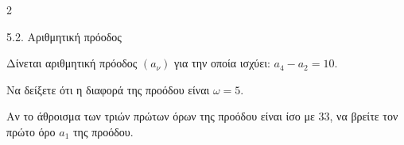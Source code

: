 \begin{ylh}{2}
    \item 5.2. Αριθμητική πρόοδος
\end{ylh}
Δίνεται αριθμητική πρόοδος $(a_\nu)$ για την οποία ισχύει: $a_4 - a_2 = 10$.
\begin{alist}
\item Να δείξετε ότι η διαφορά της προόδου είναι $\omega = 5$. 
\item Αν το άθροισμα των τριών πρώτων όρων της προόδου είναι ίσο με 33, να βρείτε τον πρώτο όρο $a_1$ της προόδου. 
\end{alist}

